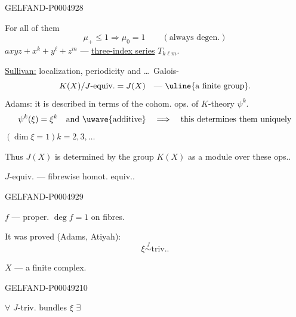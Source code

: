 \begin{GelfandAdjacentEvidence}{GELFAND-P000492}{8}


For all of them
\[
\mu_+\leqslant1\Longrightarrow\mu_0=1\qquad(\text{always degen.})
\]
\quad
$axyz+x^k+y^\ell+z^m$ — \uline{three-index series} $T_{k\ell m}$.


\uline{Sullivan:} localization, periodicity and \ldots\ Galois-
\[
K(X)/\text{\mbox{$J$}-equiv.}=J(X)\quad\text{— \uline{a finite group}}.
\]
Adams: it is described in terms of the cohom. ops. of $K$-theory $\psi^k$.
\[
\psi^k(\xi)=\xi^k\quad\text{and \uwave{additive}}
\quad\Longrightarrow\quad\text{this determines them uniquely}
\]
$(\dim\xi=1)$\qquad $k=2,3,\ldots$

Thus $J(X)$ is determined by the group $K(X)$ as a module over these ops..

$J$-equiv. — fibrewise homot. equiv..
\end{GelfandAdjacentEvidence}
\begin{GelfandAdjacentEvidence}{GELFAND-P000492}{9}

$f$ — proper. \quad $\deg f=1$ on fibres.

It was proved (Adams, Atiyah):
\[
\xi\overset{J}{\sim}\text{triv.}.
\]

$X$ — a finite complex.
\end{GelfandAdjacentEvidence}
\begin{GelfandAdjacentEvidence}{GELFAND-P000492}{10}


$\forall$ $J$-triv. bundles $\xi$
$\exists$
\end{GelfandAdjacentEvidence}
